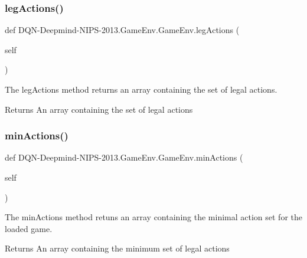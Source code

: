 \subsubsection{\texorpdfstring{leg\+Actions()}{legActions()}}
{\footnotesize\ttfamily def D\+QN-\/Deepmind-\/N\+I\+PS-\/2013.Game\+Env.\+Game\+Env.\+leg\+Actions (\begin{DoxyParamCaption}\item[{}]{self }\end{DoxyParamCaption})}



The leg\+Actions method returns an array containing the set of legal actions. 

\begin{DoxyReturn}{Returns}
An array containing the set of legal actions 
\end{DoxyReturn}
\hypertarget{classDQN-Deepmind-NIPS-2013_1_1GameEnv_1_1GameEnv_a76014d9140e479757a52b9ceda06dd16}{}\label{classDQN-Deepmind-NIPS-2013_1_1GameEnv_1_1GameEnv_a76014d9140e479757a52b9ceda06dd16} 
\subsubsection{\texorpdfstring{min\+Actions()}{minActions()}}
{\footnotesize\ttfamily def D\+QN-\/Deepmind-\/N\+I\+PS-\/2013.Game\+Env.\+Game\+Env.\+min\+Actions (\begin{DoxyParamCaption}\item[{}]{self }\end{DoxyParamCaption})}



The min\+Actions method retuns an array containing the minimal action set for the loaded game. 

\begin{DoxyReturn}{Returns}
An array containing the minimum set of legal actions 
\end{DoxyReturn}
\hypertarget{classDQN-Deepmind-NIPS-2013_1_1GameEnv_1_1GameEnv_afc780b83378b9d19d9dba64711e5c2ed}{}\label{classDQN-Deepmind-NIPS-2013_1_1GameEnv_1_1GameEnv_afc780b83378b9d19d9dba64711e5c2ed} 
